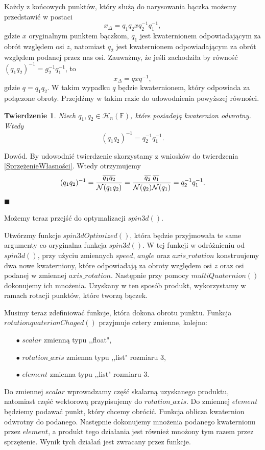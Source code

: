 \documentclass[a4paper,twoside,11pt,reqno]{mwrep}
\theoremstyle{plain} \newtheorem{twr}{Twierdzenie}
\theoremstyle{plain} \newtheorem{lem}{Lemat}
\theoremstyle{definition} \newtheorem{defi}{Definicja}
\theoremstyle{remark} \newtheorem*{wni}{Wniosek}
\theoremstyle{definition} \newtheorem{uwaga}{Uwaga}
\theoremstyle{definition}\newtheorem{prz}{Przykład}
\newenvironment{dowod}{\par\vspace{0.1cm}\par{\sc Dowód.}}{\hfill $\blacksquare$\par\vspace{0.4cm}\par}
\begin{document}
Każdy z końcowych punktów, który służą do narysowania bączka możemy przedstawić w postaci
$$x_\Delta = q_1q_2 x q_2^{-1}q_1^{-1},$$
gdzie $x$ oryginalnym punktem bączkom, $q_1$ jest kwaternionem odpowiadającym za obrót
względem osi $z$, natomiast $q_2$ jest kwaternionem odpowiadającym za obrót
względem podanej przez nas osi.
Zauważmy, że jeśli  zachodziła by równość $(q_1q_2)^{-1} =g_2^{-1}q_1^{-1}$,
to
$$x_\Delta = q x q^{-1},$$
gdzie $q = q_1q_2$. W takim wypadku $q$ będzie kwaternionem, który odpowiada za połączone 
obroty. Przejdźmy w takim razie do udowodnienia powyższej równości.
\begin{twr}
Niech $q_1,q_2 \in\mathcal{H}_n(\mathbb{F})$, które posiadają kwaternion odwrotny.
Wtedy
$$(q_1q_2)^{-1} = q_2^{-1}q_1^{-1}.$$
\end{twr}
\begin{dowod}
By udowodnić twierdzenie skorzystamy z wniosków do twierdzenia \ref{SprzężenieWłasności}.
Wtedy otrzymujemy
$$(q_1q_2)^{-1} = \frac{\overline{q_1q_2}}{\mathcal{N}(q_1q_2)}=
\frac{\overline{q_2}\hspace{1mm}\overline{q_1}}{\mathcal{N}(q_2)\mathcal{N}(q_1)} = 
q_2^{-1}q_1^{-1}.$$
\end{dowod}
Możemy teraz przejść do optymalizacji $spin3d()$.

Utwórzmy funkcje $spin3dOptimized()$, która będzie przyjmowała te same argumenty co
oryginalna funkcja $spin3d()$. W tej funkcji w odróżnieniu od $spin3d()$, 
przy użyciu zmiennych  $speed$, $angle$ oraz $axis\_rotation$ konstruujemy dwa 
nowe kwaterniony, które odpowiadają za obroty względem osi $z$ oraz osi podanej w zmiennej
$axis\_rotation$. Następnie przy pomocy $multiQuaternion()$ dokonujemy ich mnożenia. Uzyskany w
ten sposób produkt, wykorzystamy w ramach rotacji punktów, które tworzą bączek.


Musimy teraz zdefiniować funkcje, która dokona obrotu punktu. Funkcja 
$rotationquaterionChaged()$ przyjmuje cztery zmienne, kolejno:
\begin{itemize}
\item[$\bullet$] $scalar$ zmienną typu ,,float",
\item[$\bullet$] $rotation\_axis$ zmienna typu ,,list" rozmiaru $3$,
\item[$\bullet$] $element$ zmienna typu ,,list" rozmiaru $3$.
\end{itemize}
Do zmiennej $scalar$ wprowadzamy część skalarną uzyskanego produktu, natomiast część
wektorową przypisujemy do $rotation\_axis$. Do zmiennej $element$ będziemy podawać 
punkt, który chcemy obrócić. Funkcja oblicza kwaternion odwrotny do podanego.
Następnie dokonujemy mnożenia podanego kwaternionu przez $element$, a 
produkt tego działania jest również mnożony tym razem przez sprzężenie.
Wynik tych działań jest zwracany przez funkcje.
\end{document}
